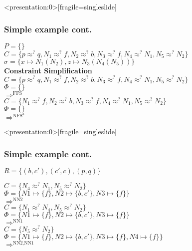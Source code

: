 	\begin{frame}<presentation:0>[fragile=singleslide]
	\frametitle{Simple example cont.}
	\(P=\{\}\)\\
	\(C=\{p \approx^? q, N_1 \approx^? f, N_2 \approx^? b, N_3 \approx^? f, N_4 \approx^? N_1, N_5 \approx^? N_2\}\)\\
	\(\sigma=\{x \mapsto N_1(N_2), z \mapsto N_3(N_4(N_5))\}\)\\
	
	\vspace{0.5cm}
	\textbf{Constraint Simplification}\\
	\(C=\{p \approx^? q, N_1 \approx^? f, N_2 \approx^? b, N_3 \approx^? f, N_4 \approx^? N_1, N_5 \approx^? N_2\}\)\\
	\(\Phi=\{\}\)\\
	\(\Rightarrow^{\text{FFS}}\)\\
	\(C=\{N_1 \approx^? f, N_2 \approx^? b, N_3 \approx^? f, N_4 \approx^? N_1, N_5 \approx^? N_2\}\)\\
	\(\Phi=\{\}\)\\
	\(\Rightarrow^{\text{NFS}^3}\)\\
		\end{frame}
		
		\begin{frame}<presentation:0>[fragile=singleslide]
	\frametitle{Simple example cont.}
	
	\textcolor[rgb]{0,0.58,0}{\begin{flushright}
	\(R=\{(b,c'),(c',c),(p,q)\}\)
	\end{flushright}}
	\(C=\{N_4 \approx^? N_1, N_5 \approx^? N_2\}\)\\
	\(\Phi=\{N1\mapsto \{f\}, N2\mapsto \{b,c'\}, N3\mapsto \{f\} \}\)\\
	\(\Rightarrow^{\text{NN2}}\)\\
	\(C=\{N_1 \approx^? N_4, N_5 \approx^? N_2\}\)\\
	\(\Phi=\{N1\mapsto \{f\}, N2\mapsto \{b,c'\}, N3\mapsto \{f\} \}\)\\
	\(\Rightarrow^{\text{NN1}}\)\\
	\(C=\{N_5 \approx^? N_2\}\)\\
	\(\Phi=\{N1\mapsto \{f\}, N2\mapsto \{b,c'\}, N3\mapsto \{f\} , N4\mapsto \{f\}\}\)\\
	\(\Rightarrow^{\text{NN2,NN1}}\)\\
		\end{frame}
		

